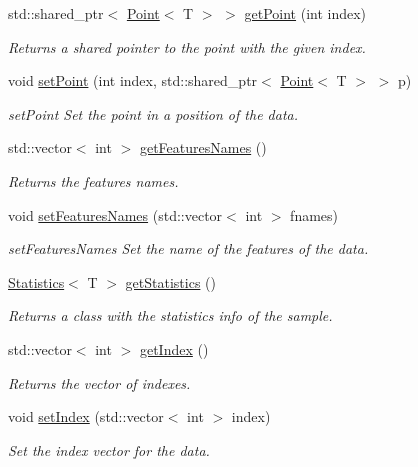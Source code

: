 \begin{DoxyCompactItemize}
std\+::shared\+\_\+ptr$<$ \hyperlink{class_point}{Point}$<$ T $>$ $>$ \hyperlink{class_data_a482efc1083d4871758ddd05b11bb90ea}{get\+Point} (int index)
\begin{DoxyCompactList}\small\item\em Returns a shared pointer to the point with the given index. \end{DoxyCompactList}\item 
void \hyperlink{class_data_ade1a5caf2f463a894e1d348f728b56cf}{set\+Point} (int index, std\+::shared\+\_\+ptr$<$ \hyperlink{class_point}{Point}$<$ T $>$ $>$ p)
\begin{DoxyCompactList}\small\item\em set\+Point Set the point in a position of the data. \end{DoxyCompactList}\item 
std\+::vector$<$ int $>$ \hyperlink{class_data_a7ca6dfe5013024d75f3e13e42caa96f4}{get\+Features\+Names} ()
\begin{DoxyCompactList}\small\item\em Returns the features names. \end{DoxyCompactList}\item 
void \hyperlink{class_data_a3b22a1e56ab54ca6ecd84bef0ad968cc}{set\+Features\+Names} (std\+::vector$<$ int $>$ fnames)
\begin{DoxyCompactList}\small\item\em set\+Features\+Names Set the name of the features of the data. \end{DoxyCompactList}\item 
\hyperlink{class_statistics}{Statistics}$<$ T $>$ \hyperlink{class_data_a7ca936cd8cbde912283f5feee441717a}{get\+Statistics} ()
\begin{DoxyCompactList}\small\item\em Returns a class with the statistics info of the sample. \end{DoxyCompactList}\item 
std\+::vector$<$ int $>$ \hyperlink{class_data_a9f64e56cea5be1f29eea9319716a3ed1}{get\+Index} ()
\begin{DoxyCompactList}\small\item\em Returns the vector of indexes. \end{DoxyCompactList}\item 
void \hyperlink{class_data_a3e03ebfa95d7d90d4ee3b024af7b18de}{set\+Index} (std\+::vector$<$ int $>$ index)
\begin{DoxyCompactList}\small\item\em Set the index vector for the data. \end{DoxyCompactList}\item 

\end{DoxyCompactItemize}
